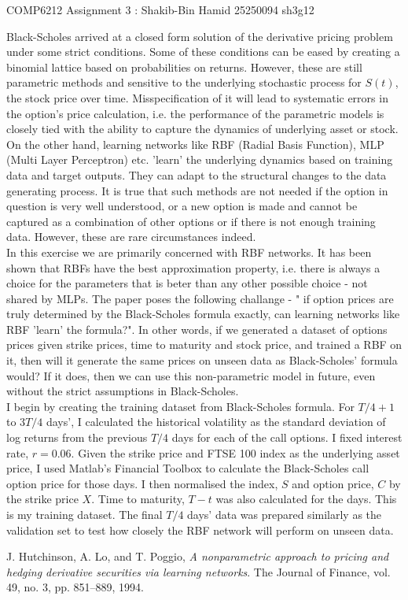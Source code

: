 \documentclass[11pt, fleqn]{article}
\begin{document}
\begin{center}

\Large{COMP6212 Assignment 3 : Shakib-Bin Hamid 25250094 sh3g12}

\end{center}

Black-Scholes arrived at a closed form solution of the derivative pricing problem under some strict conditions. Some of these conditions can be eased by creating a binomial lattice based on probabilities on returns. However, these are still parametric methods and sensitive to the underlying stochastic process for $S(t)$, the stock price over time. Misspecification of it will lead to systematic errors in the option's price calculation, i.e. the performance of the parametric models is closely tied with the ability to capture the dynamics of underlying asset or stock.\\

On the other hand, learning networks like RBF (Radial Basis Function), MLP (Multi Layer Perceptron) etc. 'learn' the underlying dynamics based on training data and target outputs. They can adapt to the structural changes to the data generating process. It is true that such methods are not needed if the option in question is very well understood, or a new option is made and cannot be captured as a combination of other options or if there is not enough training data. However, these are rare circumstances indeed.\\

In this exercise we are primarily concerned with RBF networks. It has been shown that RBFs have the best approximation property, i.e. there is always a choice for the parameters that is beter than any other possible choice - not shared by MLPs. The paper poses the following challange - " if option prices are truly determined by the Black-Scholes formula exactly, can learning networks like RBF 'learn' the formula?". In other words, if we generated a dataset of options prices given strike prices, time to maturity and stock price, and trained a RBF on it, then will it generate the same prices on unseen data as Black-Scholes' formula would? If it does, then we can use this non-parametric model in future, even without the strict assumptions in Black-Scholes.\\

I begin by creating the training dataset from Black-Scholes formula. For $T/4 + 1$ to $3T/4$ days', I calculated the historical volatility as the standard deviation of log returns from the previous $T/4$ days for each of the call options. I fixed interest rate, $r = 0.06$. Given the strike price and FTSE 100 index as the underlying asset price, I used Matlab's Financial Toolbox to calculate the Black-Scholes call option price for those days. I then normalised the index, $S$ and option price, $C$ by the strike price $X$. Time to maturity, $T-t$ was also calculated for the days. This is my training dataset. The final $T/4$ days' data was prepared similarly as the validation set to test how closely the RBF network will perform on unseen data.

\begin{thebibliography}{9}
J. Hutchinson, A. Lo, and T. Poggio,
\textit{A nonparametric  approach  to  pricing  and  hedging  derivative
securities via learning networks}. 
The Journal of Finance, vol. 49, no. 3, pp. 851–889, 1994.

\end{thebibliography}
\end{document}
